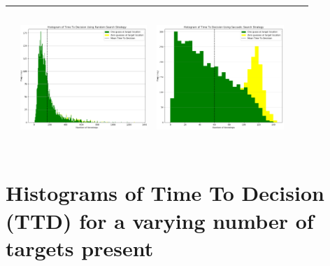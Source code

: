 \begin{landscape}
\begin{table}[h!]
\begin{tabular}{ | m{8mm} | c | c | c | c |}
\begin{minipage}[c][58mm][c]{48mm}
    \end{minipage}
    &
    \begin{minipage}[c][58mm][c]{48mm}
      \includegraphics[width=48mm, height=52mm]{Chapters/MultiAgentTargetDetection/Figs/Histograms/MiscalibratedSensor/05-02/05-02RandomHistogram.png}
    \end{minipage}
    &
    \begin{minipage}[c][58mm][c]{48mm}
      \includegraphics[width=48mm, height=52mm]{Chapters/MultiAgentTargetDetection/Figs/Histograms/MiscalibratedSensor/05-02/05-02SaccadicHistogram.png}
    \end{minipage}
    \\
    \hline
   
  \end{tabular}
  \label{table:HistVaryingSensorModelParams}
\end{table}
\break



\section{Histograms of Time To Decision (TTD) for a varying number of targets present}


\end{landscape}
